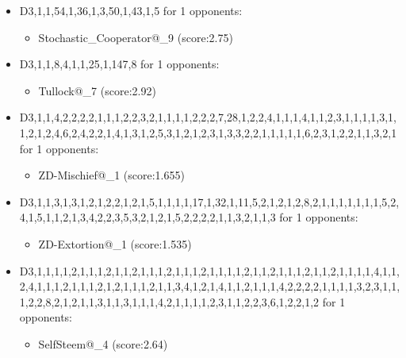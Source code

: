 \begin{appendices}
\begin{itemize}
        \item D3,1,1,54,1,36,1,3,50,1,43,1,5 for 1 opponents:
        \begin{multicols}{3}
            \begin{itemize}
                \item Stochastic\_Cooperator@\_9 (score:2.75)
            \end{itemize}
        \end{multicols}

        \item D3,1,1,8,4,1,1,25,1,147,8 for 1 opponents:
        \begin{multicols}{3}
            \begin{itemize}
                \item Tullock@\_7 (score:2.92)
            \end{itemize}
        \end{multicols}

        \item D3,1,1,4,2,2,2,2,1,1,1,2,2,3,2,1,1,1,1,2,2,2,7,28,1,2,2,4,1,1,1,4,1,1,2,3,1,1,1,1,3,1,1,2,1,2,4,6,2,4,2,2,1,4,1,3,1,2,5,3,1,2,1,2,3,1,3,3,2,2,1,1,1,1,1,6,2,3,1,2,2,1,1,3,2,1 for 1 opponents:
        \begin{multicols}{3}
            \begin{itemize}
                \item ZD-Mischief@\_1 (score:1.655)
            \end{itemize}
        \end{multicols}

        \item D3,1,1,3,1,3,1,2,1,2,2,1,2,1,5,1,1,1,1,17,1,32,1,11,5,2,1,2,1,2,8,2,1,1,1,1,1,1,1,5,2,4,1,5,1,1,2,1,3,4,2,2,3,5,3,2,1,2,1,5,2,2,2,2,1,1,3,2,1,1,3 for 1 opponents:
        \begin{multicols}{3}
            \begin{itemize}
                \item ZD-Extortion@\_1 (score:1.535)
            \end{itemize}
        \end{multicols}

        \item D3,1,1,1,1,2,1,1,1,2,1,1,2,1,1,1,2,1,1,1,2,1,1,1,1,2,1,1,2,1,1,1,2,1,1,2,1,1,1,1,4,1,1,2,4,1,1,1,2,1,1,1,2,1,2,1,1,1,2,1,1,3,4,1,2,1,4,1,1,2,1,1,1,4,2,2,2,2,1,1,1,1,3,2,3,1,1,1,2,2,8,2,1,2,1,1,3,1,1,3,1,1,1,4,2,1,1,1,1,2,3,1,1,2,2,3,6,1,2,2,1,2 for 1 opponents:
        \begin{multicols}{3}
            \begin{itemize}
                \item SelfSteem@\_4 (score:2.64)
            \end{itemize}
        \end{multicols}


\end{itemize}
\end{appendices}
